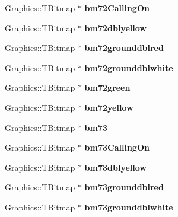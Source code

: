 \begin{DoxyCompactItemize}
Graphics\+::\+T\+Bitmap $\ast$ {\bfseries bm72\+Calling\+On}
\item 
\mbox{\label{class_t_rail_graphics_a6638edc56cc369cfc370985abf0d799a}} 
Graphics\+::\+T\+Bitmap $\ast$ {\bfseries bm72dblyellow}
\item 
\mbox{\label{class_t_rail_graphics_a70330038b72d78047a61d0f8588c025b}} 
Graphics\+::\+T\+Bitmap $\ast$ {\bfseries bm72grounddblred}
\item 
\mbox{\label{class_t_rail_graphics_a3563e64d2d013985706d75a79a6e4ff2}} 
Graphics\+::\+T\+Bitmap $\ast$ {\bfseries bm72grounddblwhite}
\item 
\mbox{\label{class_t_rail_graphics_aa134b8a4ffcc92a8edb99301906fabe1}} 
Graphics\+::\+T\+Bitmap $\ast$ {\bfseries bm72green}
\item 
\mbox{\label{class_t_rail_graphics_a52f4922c85061b33a8139ecbdb2b097e}} 
Graphics\+::\+T\+Bitmap $\ast$ {\bfseries bm72yellow}
\item 
\mbox{\label{class_t_rail_graphics_afba6ab0881ab4552fc05daeb26a14f97}} 
Graphics\+::\+T\+Bitmap $\ast$ {\bfseries bm73}
\item 
\mbox{\label{class_t_rail_graphics_a81bbd1c90910c4eb365291807e1bd4c1}} 
Graphics\+::\+T\+Bitmap $\ast$ {\bfseries bm73\+Calling\+On}
\item 
\mbox{\label{class_t_rail_graphics_a755abe25dc24b8ca47c26624af73fee0}} 
Graphics\+::\+T\+Bitmap $\ast$ {\bfseries bm73dblyellow}
\item 
\mbox{\label{class_t_rail_graphics_aebe61ce49de40e6ba9112f9044c431b7}} 
Graphics\+::\+T\+Bitmap $\ast$ {\bfseries bm73grounddblred}
\item 
\mbox{\label{class_t_rail_graphics_a9e49537e053c200389528c1a31e5d358}} 
Graphics\+::\+T\+Bitmap $\ast$ {\bfseries bm73grounddblwhite}
\item 
\mbox{\label{class_t_rail_graphics_a8bcc3224cd8f0702cd6e12f4ec505424}} 

\end{DoxyCompactItemize}
